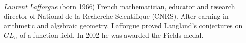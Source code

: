 \documentclass[12pt]{article}
\begin{document}
\emph{Laurent Lafforgue} (born 1966) French mathematician, educator and research director of  National de la Recherche Scientifique (CNRS). After earning  in arithmetic and algebraic geometry, Lafforgue proved Langland's conjectures on $GL_n$ of a function field. In 2002 he was awarded the Fields medal.
\end{document}
